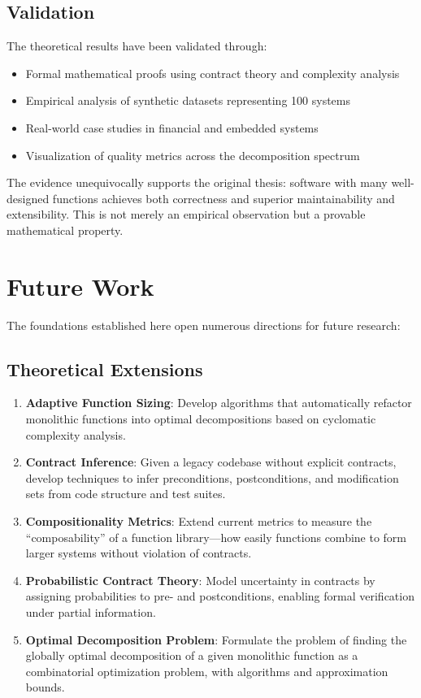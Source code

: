 \documentclass[a4paper,12pt]{article}
\theoremstyle{definition}
\begin{document}
\subsection{Validation}

The theoretical results have been validated through:

\begin{itemize}
	\item Formal mathematical proofs using contract theory and complexity analysis
	\item Empirical analysis of synthetic datasets representing 100 systems
	\item Real-world case studies in financial and embedded systems
	\item Visualization of quality metrics across the decomposition spectrum
\end{itemize}

The evidence unequivocally supports the original thesis: software with many well-designed functions achieves both correctness and superior maintainability and extensibility. This is not merely an empirical observation but a provable mathematical property.

\section{Future Work}

The foundations established here open numerous directions for future research:

\subsection{Theoretical Extensions}

\begin{enumerate}
	\item \textbf{Adaptive Function Sizing}: Develop algorithms that automatically refactor monolithic functions into optimal decompositions based on cyclomatic complexity analysis.
	
	\item \textbf{Contract Inference}: Given a legacy codebase without explicit contracts, develop techniques to infer preconditions, postconditions, and modification sets from code structure and test suites.
	
	\item \textbf{Compositionality Metrics}: Extend current metrics to measure the ``composability'' of a function library—how easily functions combine to form larger systems without violation of contracts.
	
	\item \textbf{Probabilistic Contract Theory}: Model uncertainty in contracts by assigning probabilities to pre- and postconditions, enabling formal verification under partial information.
	
	\item \textbf{Optimal Decomposition Problem}: Formulate the problem of finding the globally optimal decomposition of a given monolithic function as a combinatorial optimization problem, with algorithms and approximation bounds.
\end{enumerate}
\end{document}
